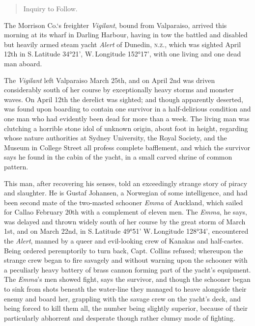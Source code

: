\begin{pages}
\begin{Leftside}
\begin{quote}
Inquiry to Follow.
\end{quote}


The Morrison Co.`s freighter \emph{Vigilant}, bound from Valparaiso, arrived
this morning at its wharf in Darling Harbour, having in tow the battled
and disabled but heavily armed steam yacht \emph{Alert} of Dunedin, \textsc{n.z.}, which
was sighted April 12th in S.\,Latitude 34°21', W.\,Longitude 152°17', with
one living and one dead man aboard.

The \emph{Vigilant} left Valparaiso March 25th, and on April 2nd was driven
considerably south of her course by exceptionally heavy storms and
monster waves. On April 12th the derelict was sighted; and though
apparently deserted, was found upon boarding to contain one survivor in
a half-delirious condition and one man who had evidently been dead for
more than a week. The living man was clutching a horrible stone idol of
unknown origin, about foot in height, regarding whose nature authorities
at Sydney University, the Royal Society, and the Museum in College
Street all profess complete bafflement, and which the survivor says he
found in the cabin of the yacht, in a small carved shrine of common
pattern.

This man, after recovering his senses, told an exceedingly strange story
of piracy and slaughter. He is Gustaf Johansen, a Norwegian of some
intelligence, and had been second mate of the two-masted schooner \emph{Emma}
of Auckland, which sailed for Callao February 20th with a complement of
eleven men. The \emph{Emma}, he says, was delayed and thrown widely south of
her course by the great storm of March 1st, and on March 22nd, in S.\,Latitude 49°51' W.\,Longitude 128°34', encountered the \emph{Alert}, manned by a
queer and evil-looking crew of Kanakas and half-castes. Being ordered
peremptorily to turn back, Capt. Collins refused; whereupon the strange
crew began to fire savagely and without warning upon the schooner with a
peculiarly heavy battery of brass cannon forming part of the yacht's
equipment. The \emph{Emma}'s men showed fight, says the survivor, and though
the schooner began to sink from shots beneath the water-line they
managed to heave alongside their enemy and board her, grappling with the
 savage crew on the yacht's deck, and being forced to kill them all, the
number being slightly superior, because of their particularly abhorrent
and desperate though rather clumsy mode of fighting.


\end{Leftside}
\end{pages}
